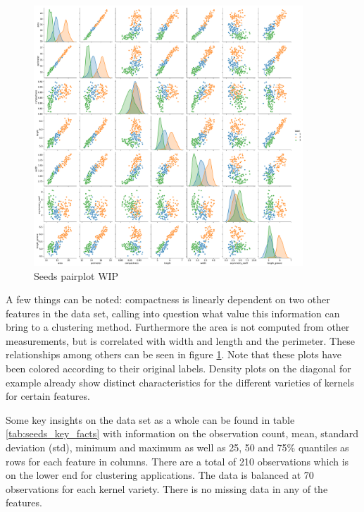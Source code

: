 \begin{figure}[H]
\caption{Seeds pairplot WIP}
%
\begin{center}
\includegraphics[width=0.9\textwidth]{images/seeds_pairplot.pdf}
\end{center}
\label{fig:seeds_pairplot}
\end{figure}

\vspace{-0.5cm}
A few things can be noted: compactness is linearly dependent on two other features in the data set, calling into question what value this information can bring to a clustering method. Furthermore the area is not computed from other measurements, but is correlated with width and length and the perimeter. These relationships among others can be seen in figure \ref{fig:seeds_pairplot}. Note that these plots have been colored according to their original labels. Density plots on the diagonal for example already show distinct characteristics for the different varieties of kernels for certain features. 

Some key insights on the data set as a whole can be found in table \ref{tab:seeds_key_facts} with information on the observation count, mean, standard deviation (std), minimum and maximum as well as 25, 50 and 75\% quantiles as rows for each feature in columns. There are a total of 210 observations which is on the lower end for clustering applications. The data is balanced at 70 observations for each kernel variety. There is no missing data in any of the features.

